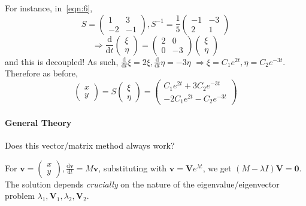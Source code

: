 \documentclass[12pt]{report}
\theoremstyle{definition}
\begin{document}
For instance, in~\eqref{eqn:6}, \[
    S = \begin{pmatrix}
        1 & 3 \\
        -2 & -1
    \end{pmatrix}, S^{-1} = \frac{1}{5} \begin{pmatrix}
        -1 & -3 \\
        2 & 1
    \end{pmatrix} 
\]\[
    \Rightarrow{}\frac{\mathrm{d}}{\mathrm{d}t} \begin{pmatrix}
            \xi \\
            \eta
    \end{pmatrix} = \begin{pmatrix}
    2 & 0 \\
    0 & -3
    \end{pmatrix} \begin{pmatrix}
            \xi \\
            \eta
    \end{pmatrix}
\]and this is decoupled!
As such, $\frac{\mathrm{d}}{\mathrm{d}t} \xi = 2\xi, \frac{\mathrm{d}}{\mathrm{d}t} \eta = -3\eta$
$\Rightarrow{}\xi = C_1 e^{2t}, \eta = C_2 e^{-3t}$. Therefore as before, \[
    \begin{pmatrix}
            x \\
            y
    \end{pmatrix}  = S\begin{pmatrix}
            \xi \\
            \eta
    \end{pmatrix} = \begin{pmatrix}
            C_1 e^{2t} + 3C_2 e^{-3t} \\
            -2C_1 e^{2t} - C_2 e^{-3t}
    \end{pmatrix} 
\]

\paragraph{General Theory}
Does this vector/matrix method always work?

For $\pmb{v} = \begin{pmatrix}
        x \\
        y
\end{pmatrix} , \frac{\mathrm{d}\pmb{v}}{\mathrm{d}t} = M\pmb{v}$,
substituting with $\pmb{v} = \pmb{V}e^{\lambda t}$,
we get $(M - \lambda I)\pmb{V} = \pmb{0}$.
The solution depends \emph{crucially} on the nature of the eigenvalue/eigenvector problem
$\lambda_1, \pmb{V}_1, \lambda_2, \pmb{V}_2$.
\end{document}

